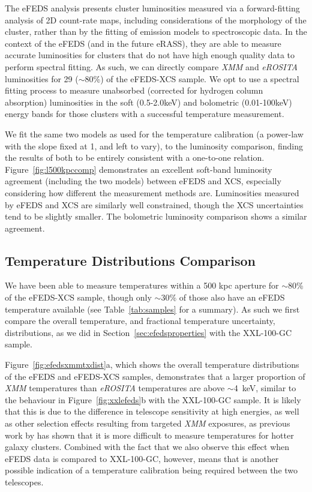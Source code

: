 \documentclass[fleqn,usenatbib]{mnras}
\begin{document}
The eFEDS analysis presents cluster luminosities measured via a forward-fitting analysis of 2D count-rate maps, including considerations of the morphology of the cluster, rather than by the fitting of emission models to spectroscopic data. In the context of the eFEDS (and in the future eRASS), they are able to measure accurate luminosities for clusters that do not have high enough quality data to perform spectral fitting. As such, we can directly compare {\em XMM} and {\em eROSITA} luminosities for {\color{red} 29 (${\sim}$80\%)} of the eFEDS-XCS sample. We opt to use a spectral fitting process to measure unabsorbed (corrected for hydrogen column absorption) luminosities in the soft (0.5-2.0keV) and bolometric (0.01-100keV) energy bands for those clusters with a successful temperature measurement.

We fit the same two models as used for the temperature calibration (a power-law with the slope fixed at 1, and left to vary), to the luminosity comparison, finding the results of both to be entirely consistent with a one-to-one relation. Figure~\ref{fig:l500kpccomp} demonstrates an excellent soft-band luminosity agreement (including the two models) between eFEDS and XCS, especially considering how different the measurement methods are. Luminosities measured by eFEDS and XCS are similarly well constrained, though the XCS uncertainties tend to be slightly smaller. The bolometric luminosity comparison shows a similar agreement.

\subsection{Temperature Distributions Comparison}
We have been able to measure temperatures within a 500 kpc aperture for ${\sim}$80\% of the eFEDS-XCS sample, though only ${\sim}$30\% of those also have an eFEDS temperature available (see Table~\ref{tab:samples} for a summary). As such we first compare the overall temperature, and fractional temperature uncertainty, distributions, as we did in Section~\ref{sec:efedsproperties} with the XXL-100-GC sample.

Figure~\ref{fig:efedsxmmtxdist}a, which shows the overall temperature distributions of the eFEDS and eFEDS-XCS samples, demonstrates that a larger proportion of {\em XMM} temperatures than {\em eROSITA} temperatures are above ${\sim}$4~keV, similar to the behaviour in Figure~\ref{fig:xxlefeds}b with the XXL-100-GC sample. It is likely that this is due to the difference in telescope sensitivity at high energies, as well as other selection effects resulting from targeted {\em XMM} exposures, as previous work by \cite{xcsmethod} has shown that it is more difficult to measure temperatures for hotter galaxy clusters. Combined with the fact that we also observe this effect when eFEDS data is compared to XXL-100-GC, however, means that is another possible indication of a temperature calibration being required between the two telescopes. 
\end{document}

